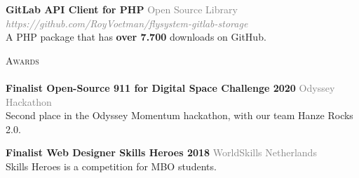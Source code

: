 \documentclass[a4paper]{article}
\newcommand{\lineunder} {
    \vspace*{-8pt} \\
    \hspace*{-18pt} \hrulefill \\
}
\newcommand{\header} [1] {
    {\hspace*{-18pt}\vspace*{6pt} \textsc{#1}}
    \vspace*{-6pt} \lineunder
}
\begin{document}
{\textbf{GitLab API Client for PHP}} \hfill \textcolor{gray}{Open Source Library}\\
\textcolor{gray}{\emph{https://github.com/RoyVoetman/flysystem-gitlab-storage}}\\
A PHP package that has \textbf{over 7.700} downloads on GitHub.
\vspace*{2mm}

\vspace{2mm}

\vspace{5mm}

\header{Awards}
\textbf{Finalist Open-Source 911 for Digital Space Challenge 2020} \hfill \textcolor{gray}{Odyssey Hackathon}\\
Second place in the Odyssey Momentum hackathon, with our team Hanze Rocks 2.0.
\vspace*{2mm}

\textbf{Finalist Web Designer Skills Heroes 2018} \hfill \textcolor{gray}{WorldSkills Netherlands}\\
Skills Heroes is a competition for MBO students.
\vspace*{2mm}

\ 
\end{document}
